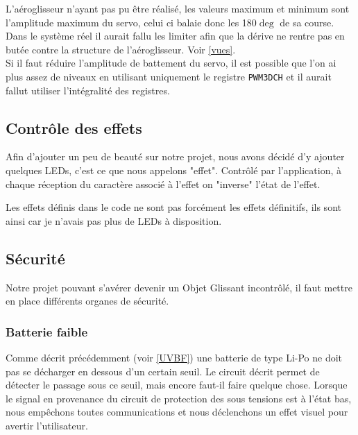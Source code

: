 				\begin{tcolorbox}[center,width=0.9\textwidth, colframe=red!90!orange, colback=orange!25, arc=3mm,boxrule=1mm, sharp corners=east,title=Note]
			L'aéroglisseur n'ayant pas pu être réalisé, les valeurs maximum et minimum sont l'amplitude maximum du servo, celui ci balaie donc les 180$\deg$ de sa course. Dans le système réel il aurait fallu les limiter afin que la dérive ne rentre pas en butée contre la structure de l'aéroglisseur. Voir \ref{vues}.\\
			Si il faut réduire l'amplitude de battement du servo, il est possible que l'on ai plus assez de niveaux en utilisant uniquement le registre \texttt{PWM3DCH} et il aurait fallut utiliser l'intégralité des registres.
  			\end{tcolorbox}
			
			\subsection{Contrôle des effets}
			Afin d'ajouter un peu de beauté sur notre projet, nous avons décidé d'y ajouter quelques LEDs, c'est ce que nous appelons "effet". Contrôlé par l'application, à chaque réception du caractère associé à l'effet on "inverse" l'état de l'effet.
			\begin{tcolorbox}[center,width=0.9\textwidth, colframe=red!90!orange, colback=orange!25, arc=3mm,boxrule=1mm, sharp corners=east,title=Note]
			Les effets définis dans le code ne sont pas forcément les effets définitifs, ils sont ainsi car je n'avais pas plus de LEDs à disposition.
  			\end{tcolorbox}
			
			\subsection{Sécurité}\label{secu}
			Notre projet pouvant s'avérer devenir un Objet Glissant incontrôlé, il faut mettre en place différents organes de sécurité.
			
				\subsubsection{Batterie faible}
				Comme décrit précédemment (voir \ref{UVBF}) une batterie de type Li-Po ne doit pas se décharger en dessous d'un certain seuil. Le circuit décrit permet de détecter le passage sous ce seuil, mais encore faut-il faire quelque chose. Lorsque le signal en provenance du circuit de protection des sous tensions est à l'état bas, nous empêchons toutes communications et nous déclenchons un effet visuel pour avertir l'utilisateur.
